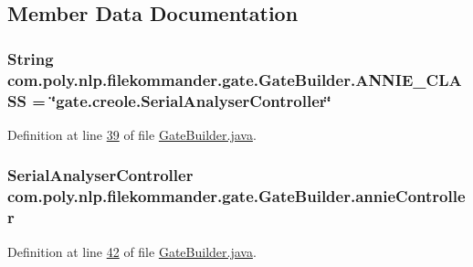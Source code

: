\subsection{Member Data Documentation}
\hypertarget{classcom_1_1poly_1_1nlp_1_1filekommander_1_1gate_1_1_gate_builder_a39a6c089a884f6318ae963e21b8fc3bf}{
\subsubsection[{A\-N\-N\-I\-E\-\_\-\-C\-L\-A\-S\-S}]{\setlength{\rightskip}{0pt plus 5cm}String com.\-poly.\-nlp.\-filekommander.\-gate.\-Gate\-Builder.\-A\-N\-N\-I\-E\-\_\-\-C\-L\-A\-S\-S = \char`\"{}gate.\-creole.\-Serial\-Analyser\-Controller\char`\"{}\hspace{0.3cm}{\ttfamily [private]}}}\label{classcom_1_1poly_1_1nlp_1_1filekommander_1_1gate_1_1_gate_builder_a39a6c089a884f6318ae963e21b8fc3bf}


Definition at line \hyperlink{L39}{39} of file \hyperlink{}{Gate\-Builder.\-java}.

\hypertarget{classcom_1_1poly_1_1nlp_1_1filekommander_1_1gate_1_1_gate_builder_a3801bc53fd7b7449a0aa714ad21bebea}{
\subsubsection[{annie\-Controller}]{\setlength{\rightskip}{0pt plus 5cm}Serial\-Analyser\-Controller com.\-poly.\-nlp.\-filekommander.\-gate.\-Gate\-Builder.\-annie\-Controller\hspace{0.3cm}{\ttfamily [private]}}}\label{classcom_1_1poly_1_1nlp_1_1filekommander_1_1gate_1_1_gate_builder_a3801bc53fd7b7449a0aa714ad21bebea}


Definition at line \hyperlink{L42}{42} of file \hyperlink{}{Gate\-Builder.\-java}.

